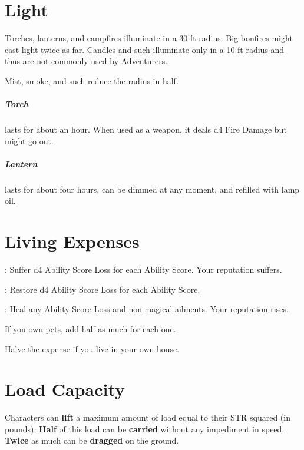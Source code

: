 \documentclass[itdr]{subfiles}
\begin{document}
\vfill

\section{Light}

Torches, lanterns, and campfires illuminate in a \mbox{30-ft} radius. Big bonfires might cast light twice as far. Candles and such illuminate only in a 10-ft radius and thus are not commonly used by Adventurers.

Mist, smoke, and such reduce the radius in half.

\subparagraph{Torch} lasts for about an hour. When used as a weapon, it deals d4 Fire Damage but might go out.

\subparagraph{Lantern} lasts for about four hours, can be dimmed at any moment, and refilled with lamp oil.

\vfill

\section{Living Expenses}

:
Suffer d4 Ability Score Loss for each Ability Score. Your reputation suffers.

:
Restore d4 Ability Score Loss for each Ability Score.

:
Heal any Ability Score Loss and non-magical ailments. Your reputation rises.

If you own pets, add half as much for each one.

Halve the expense if you live in your own house.

\vfill

\section{Load Capacity}

Characters can \textbf{lift} a maximum amount of load equal to their STR squared (in pounds). \textbf{Half} of this load can be \textbf{carried} without any impediment in speed. \textbf{Twice} as much can be \textbf{dragged} on the ground.
\end{document}
